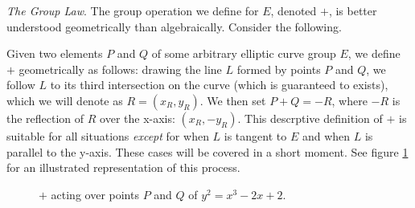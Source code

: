 \noindent
\emph{The Group Law}. The group operation we define for $E$, denoted $+$, is better understood geometrically than algebraically. Consider the following.

Given two elements $P$ and $Q$ of some arbitrary elliptic curve group $E$, we define $+$ geometrically as follows: drawing the line $L$ formed by points $P$ and $Q$, we follow $L$ to its third intersection on the curve (which is guaranteed to exists), which we will denote as $R = (x_R, y_R)$. We then set $P + Q = -R$, where $-R$ is the reflection of $R$ over the x-axis: $(x_R, -y_R)$. This descrptive definition of $+$ is suitable for all situations \emph{except} for when $L$ is tangent to $E$ and when $L$ is parallel to the y-axis. These cases will be covered in a short moment. See figure \ref{fig:groupop} for an illustrated representation of this process.

\begin{figure}[!h]
\caption{$+$ acting over points $P$ and $Q$ of $y^2 = x^3 - 2x + 2$.}
\label{fig:groupop}
\end{figure}

